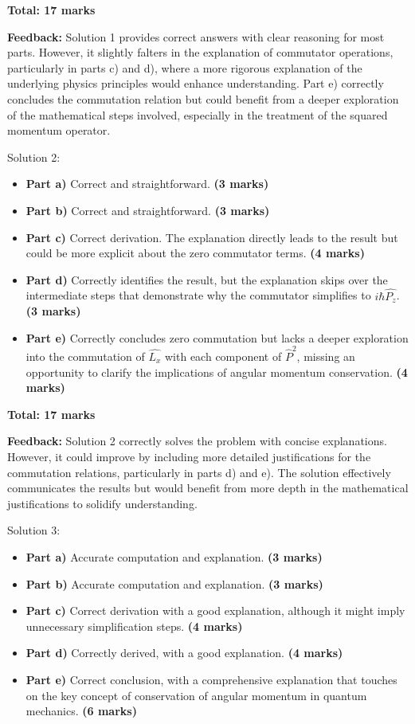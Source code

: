 \documentclass[a4paper,11pt]{article}
\begin{document}
\textbf{Total: 17 marks}

\textbf{Feedback:} Solution 1 provides correct answers with clear reasoning for most parts. However, it slightly falters in the explanation of commutator operations, particularly in parts c) and d), where a more rigorous explanation of the underlying physics principles would enhance understanding. Part e) correctly concludes the commutation relation but could benefit from a deeper exploration of the mathematical steps involved, especially in the treatment of the squared momentum operator.

Solution 2:

\begin{itemize}
    \item \textbf{Part a)} Correct and straightforward. \textbf{(3 marks)}
    \item \textbf{Part b)} Correct and straightforward. \textbf{(3 marks)}
    \item \textbf{Part c)} Correct derivation. The explanation directly leads to the result but could be more explicit about the zero commutator terms. \textbf{(4 marks)}
    \item \textbf{Part d)} Correctly identifies the result, but the explanation skips over the intermediate steps that demonstrate why the commutator simplifies to \( i\hbar\hat{P_{z}} \). \textbf{(3 marks)}
    \item \textbf{Part e)} Correctly concludes zero commutation but lacks a deeper exploration into the commutation of \( \hat{L_{x}} \) with each component of \( \hat{P}^{2} \), missing an opportunity to clarify the implications of angular momentum conservation. \textbf{(4 marks)}
\end{itemize}

\textbf{Total: 17 marks}

\textbf{Feedback:} Solution 2 correctly solves the problem with concise explanations. However, it could improve by including more detailed justifications for the commutation relations, particularly in parts d) and e). The solution effectively communicates the results but would benefit from more depth in the mathematical justifications to solidify understanding.

Solution 3:

\begin{itemize}
    \item \textbf{Part a)} Accurate computation and explanation. \textbf{(3 marks)}
    \item \textbf{Part b)} Accurate computation and explanation. \textbf{(3 marks)}
    \item \textbf{Part c)} Correct derivation with a good explanation, although it might imply unnecessary simplification steps. \textbf{(4 marks)}
    \item \textbf{Part d)} Correctly derived, with a good explanation. \textbf{(4 marks)}
    \item \textbf{Part e)} Correct conclusion, with a comprehensive explanation that touches on the key concept of conservation of angular momentum in quantum mechanics. \textbf{(6 marks)}
\end{itemize}
\end{document}
